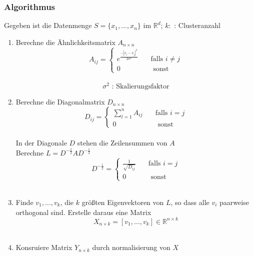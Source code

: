 \subsubsection{Algorithmus}
Gegeben ist die Datenmenge \(S = \{x_1,\dotsc,x_n\} \text{ im }\mathbb{R}^d\); \(k:\) : Clusteranzahl\\

\begin{enumerate}
	\item Berechne die Ähnlichkeitsmatrix \(A_{n\times n}\)\\
	
	\[A_{ij} =  
	\begin{cases}
    e^{\frac{-|x_i-x_j|^2}{2\sigma^2} }      & \quad \text{falls } i \neq j\\
    0 & \quad \text{ sonst}
  \end{cases}\]\\
	
	\[\sigma^2\text{ : Skalierungsfaktor}\]
	\item Berechne die Diagonalmatrix \(D_{n\times n}\)\\
	\[D_{ij} = 
		\begin{cases}
    \displaystyle\sum_{l=1}^n  A_{ij}    & \quad \text{falls } i = j\\
    0 & \quad \text{ sonst}
	
  \end{cases}\]\\
	
		In der Diagonale \(D\) stehen die Zeilensummen von \(A\)\\
		Berechne \(L = D^{-\frac{1}{2}}AD^{-\frac{1}{2}}\)\\
				\[D^{-\frac{1}{2}} =
		\begin{cases}
    \frac{1}{\sqrt{D_{ij}}}    & \quad \text{falls } i = j\\
    0 & \quad \text{ sonst}
	
  \end{cases}\]\\
	
	\item Finde \(v_1,\dotsc,v_k\), die \(k\) größten Eigenvektoren von \(L\), so dass alle \(v_i\) paarweise orthogonal sind. Erstelle daraus eine Matrix\\
	
	\[X_{n\times k} = [v_1,\dotsc,v_k] \in \mathbb{R}^{n\times k}\]\\
	
	
	\item Konsruiere Matrix \(Y_{n\times k}\) durch normalisierung von \(X\)\\
	

\end{enumerate}
